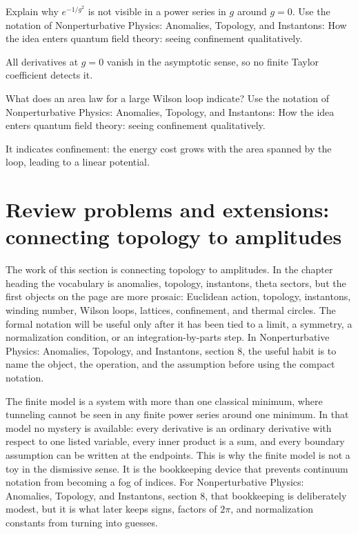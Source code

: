\begin{exercise}
Explain why \(e^{-1/g^2}\) is not visible in a power series in \(g\) around \(g=0\).  Use the notation of Nonperturbative Physics: Anomalies, Topology, and Instantons: How the idea enters quantum field theory: seeing confinement qualitatively.
\begin{answer}
All derivatives at \(g=0\) vanish in the asymptotic sense, so no finite Taylor coefficient detects it.
\end{answer}
\end{exercise}

\begin{exercise}
What does an area law for a large Wilson loop indicate?  Use the notation of Nonperturbative Physics: Anomalies, Topology, and Instantons: How the idea enters quantum field theory: seeing confinement qualitatively.
\begin{answer}
It indicates confinement: the energy cost grows with the area spanned by the loop, leading to a linear potential.
\end{answer}
\end{exercise}



\section{Review problems and extensions: connecting topology to amplitudes}

The work of this section is connecting topology to amplitudes.  In the chapter heading the vocabulary is anomalies, topology, instantons, theta sectors, but the first objects on the page are more prosaic: Euclidean action, topology, instantons, winding number, Wilson loops, lattices, confinement, and thermal circles.  The formal notation will be useful only after it has been tied to a limit, a symmetry, a normalization condition, or an integration-by-parts step.  In Nonperturbative Physics: Anomalies, Topology, and Instantons, section 8, the useful habit is to name the object, the operation, and the assumption before using the compact notation.

The finite model is a system with more than one classical minimum, where tunneling cannot be seen in any finite power series around one minimum.  In that model no mystery is available: every derivative is an ordinary derivative with respect to one listed variable, every inner product is a sum, and every boundary assumption can be written at the endpoints.  This is why the finite model is not a toy in the dismissive sense.  It is the bookkeeping device that prevents continuum notation from becoming a fog of indices.  For Nonperturbative Physics: Anomalies, Topology, and Instantons, section 8, that bookkeeping is deliberately modest, but it is what later keeps signs, factors of \(2\pi\), and normalization constants from turning into guesses.

